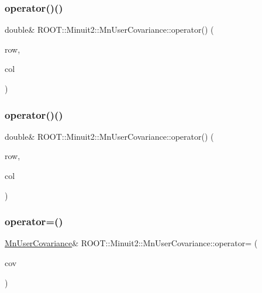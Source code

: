 \subsubsection{\texorpdfstring{operator()()}{operator()()}\hspace{0.1cm}{\footnotesize\ttfamily [3/4]}}
{\footnotesize\ttfamily double\& R\+O\+O\+T\+::\+Minuit2\+::\+Mn\+User\+Covariance\+::operator() (\begin{DoxyParamCaption}\item[{unsigned int}]{row,  }\item[{unsigned int}]{col }\end{DoxyParamCaption})\hspace{0.3cm}{\ttfamily [inline]}}

\mbox{\label{classROOT_1_1Minuit2_1_1MnUserCovariance_af63a82e8fc0c72cdb46fe670da78ffce}} 
\subsubsection{\texorpdfstring{operator()()}{operator()()}\hspace{0.1cm}{\footnotesize\ttfamily [4/4]}}
{\footnotesize\ttfamily double\& R\+O\+O\+T\+::\+Minuit2\+::\+Mn\+User\+Covariance\+::operator() (\begin{DoxyParamCaption}\item[{unsigned int}]{row,  }\item[{unsigned int}]{col }\end{DoxyParamCaption})\hspace{0.3cm}{\ttfamily [inline]}}

\mbox{\label{classROOT_1_1Minuit2_1_1MnUserCovariance_a404884fb8452152d56ff18f83e277960}} 
\subsubsection{\texorpdfstring{operator=()}{operator=()}\hspace{0.1cm}{\footnotesize\ttfamily [1/2]}}
{\footnotesize\ttfamily \mbox{\hyperlink{classROOT_1_1Minuit2_1_1MnUserCovariance}{Mn\+User\+Covariance}}\& R\+O\+O\+T\+::\+Minuit2\+::\+Mn\+User\+Covariance\+::operator= (\begin{DoxyParamCaption}\item[{const \mbox{\hyperlink{classROOT_1_1Minuit2_1_1MnUserCovariance}{Mn\+User\+Covariance}} \&}]{cov }\end{DoxyParamCaption})\hspace{0.3cm}{\ttfamily [inline]}}

